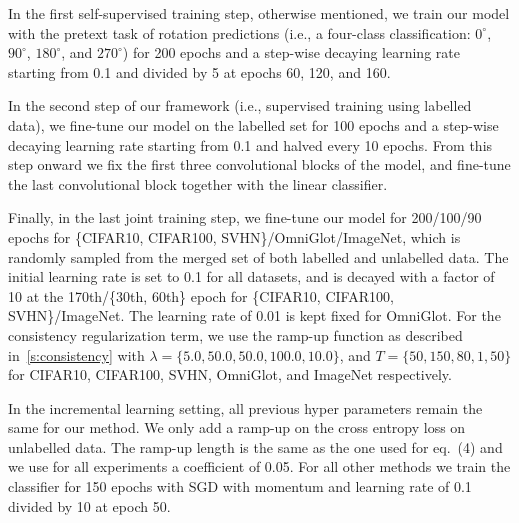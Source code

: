 In the first self-supervised training step,  otherwise mentioned, we train our model with the pretext task of rotation predictions (i.e., a four-class classification: $0^{\circ}$, $90^{\circ}$, $180^{\circ}$, and $270^{\circ}$) for 200 epochs and a step-wise decaying learning rate starting from 0.1 and divided by 5 at epochs 60, 120, and 160.

In the second step of our framework (i.e., supervised training using labelled data), we fine-tune our model on the labelled set for 100 epochs and a step-wise decaying learning rate starting from 0.1 and halved every 10 epochs.
From this step onward we fix the first three convolutional blocks of the model, and fine-tune the last convolutional block together with the linear classifier.

Finally, in the last joint training step, we fine-tune our model for 200/100/90 epochs for \{CIFAR10, CIFAR100, SVHN\}/OmniGlot/ImageNet, which is randomly sampled from the merged set of both labelled and unlabelled data.
The initial learning rate is set to 0.1 for all datasets, and is decayed with a factor of 10 at the 170th/\{30th, 60th\} epoch for \{CIFAR10, CIFAR100, SVHN\}/ImageNet.
The learning rate of 0.01 is kept fixed for OmniGlot.
For the consistency regularization term, we use the ramp-up function as described in~\cref{s:consistency} with $\lambda = \{5.0, 50.0, 50.0, 100.0, 10.0\}$, and $T = \{50, 150, 80, 1, 50\}$ for CIFAR10, CIFAR100, SVHN, OmniGlot, and ImageNet respectively.

In the incremental learning setting, all previous hyper parameters remain the same for our method.
We only add a ramp-up on the cross entropy loss on unlabelled data.
The ramp-up length is the same as the one used for eq.~(4) and we use for all experiments a coefficient of 0.05.
For all other methods we train the classifier for 150 epochs with SGD with momentum and learning rate of 0.1 divided by 10 at epoch 50.


